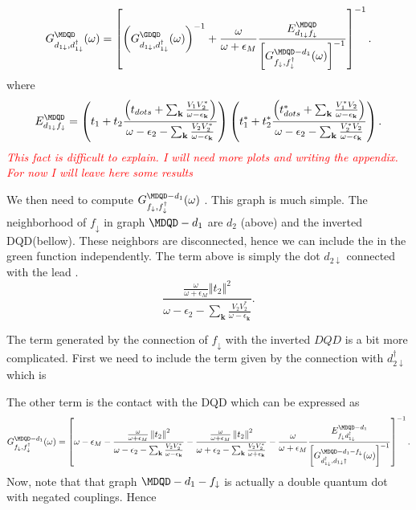 \documentclass[showpacs,aps,prb,reprint,superscriptaddress]{revtex4-1}
\newcommand{\Jesus}[1]{\textcolor{red}{\fbox{Jesus} {\sl#1}}}
\begin{document}
 
\begin{widetext}
\begin{equation}
    \GreenG{d_{1\downarrow},d_{1\downarrow}^{\dagger}}{\MDQD}=\left[\left(\GreenG{d_{1\downarrow},d_{1\downarrow}^{\dagger}}{\GDQD } \right)^{-1}+\frac{\omega}{\omega+\epsilon_{M}}\frac{E_{d_{1\dw}f_{\dw}}^{\MDQD}}{\left[\GreenG{f_{\downarrow},f_{\downarrow}^{\dagger}}{\MDQD-d_{1}}\right]^{-1}}\right]^{-1}.
\end{equation}
where 
\begin{equation}
    E_{d_{1\dw}f_{\dw}}^{\MDQD}=\left(t_{1}+t_{2}\frac{\left(t_{dots}+\sum_{\mathbf{k}}\frac{V_{1}V_{2}^{*}}{\omega-\epsilon_{\mathbf{k}}}\right)}{\omega-\epsilon_{2}-\sum_{\mathbf{k}}\frac{V_{2}V_{2}^{*}}{\omega-\epsilon_{\mathbf{k}}}}\right)\left(t_{1}^{*}+t_{2}^{*}\frac{\left(t_{dots}^{*}+\sum_{\mathbf{k}}\frac{V_{1}^{*}V_{2}}{\omega-\epsilon_{\mathbf{k}}}\right)}{\omega-\epsilon_{2}-\sum_{\mathbf{k}}\frac{V_{2}^{*}V_{2}}{\omega-\epsilon_{\mathbf{k}}}}\right).
\end{equation}
\Jesus{This fact is difficult to explain. I will need more plots and writing the appendix. For now I will leave here some results}

We then need to compute $\GreenG{f_{\downarrow},f_{\downarrow}^{\dagger}}{\MDQD-d_{1}}$ . This graph is much simple. The neighborhood of  $f_{\downarrow}$ in graph ${\MDQD-d_{1}}$ are $d_2$ (above) and the inverted DQD(bellow). These neighbors are disconnected, hence we can include the in the green function independently. The term above is simply the dot $d_{2\downarrow}$ connected with the lead . 
\begin{equation}
    \frac{\frac{\omega}{\omega+\epsilon_{M}}\left\Vert t_{2}\right\Vert ^{2}}{\omega-\epsilon_{2}-\sum_{\mathbf{k}}\frac{V_{2}V_{2}^{*}}{\omega-\epsilon_{\mathbf{k}}}}.
\end{equation}

 
The term generated by the connection of $f_{\downarrow}$  with the inverted $DQD$ is a bit more complicated. First we need to include the term given by the connection with  $d_{2\downarrow}^\dagger$ which is 

The other term is the contact with the DQD which can be expressed as 
\begin{equation}
    \GreenG{f_{\downarrow},f_{\downarrow}^{\dagger}}{\MDQD-d_{1}}=\left[\omega-\epsilon_{M}-\frac{\frac{\omega}{\omega+\epsilon_{M}}\left\Vert t_{2}\right\Vert ^{2}}{\omega-\epsilon_{2}-\sum_{\mathbf{k}}\frac{V_{2}V_{2}^{*}}{\omega-\epsilon_{\mathbf{k}}}}-\frac{\frac{\omega}{\omega+\epsilon_{M}}\left\Vert t_{2}\right\Vert ^{2}}{\omega+\epsilon_{2}-\sum_{\mathbf{k}}\frac{V_{2}V_{2}^{*}}{\omega+\epsilon_{\mathbf{k}}}}-\frac{\omega}{\omega+\epsilon_{M}}\frac{E_{f_{\dw}d_{1\dw}^\dagger}^{\MDQD-d_1}}{\left[\GreenG{d_{1\downarrow}^{\dagger},d_{1\downarrow}{\dagger}}{\MDQD-d_{1}-f_{\downarrow}}\right]^{-1}}\right]^{-1}.
\end{equation}
Now, note that that graph $\MDQD-d_{1}-f_{\downarrow}$ is actually a double quantum dot with negated couplings. Hence 
\end{widetext}
\end{document}
